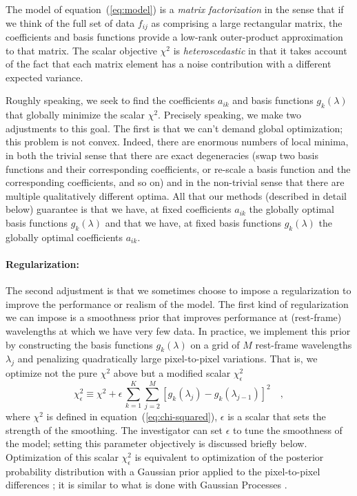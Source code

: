 \documentclass[12pt,preprint]{aastex}
\newcommand{\equationname}{equation}
\begin{document}
The model of \equationname~(\ref{eq:model}) is a \emph{matrix
  factorization} in the sense that if we think of the full set of data
$f_{ij}$ as comprising a large rectangular matrix, the coefficients
and basis functions provide a low-rank outer-product approximation to
that matrix.  The scalar objective $\chi^2$ is \emph{heteroscedastic}
in that it takes account of the fact that each matrix element has a
noise contribution with a different expected variance.

Roughly speaking, we seek to find the coefficients $a_{ik}$ and basis
functions $g_k(\lambda)$ that globally minimize the scalar $\chi^2$.
Precisely speaking, we make two adjustments to this goal. The first is
that we can't demand global optimization; this problem is not convex.
Indeed, there are enormous numbers of local minima, in both the
trivial sense that there are exact degeneracies (swap two basis
functions and their corresponding coefficients, or re-scale a basis
function and the corresponding coefficients, and so on) and in the
non-trivial sense that there are multiple qualitatively different
optima. All that our methods (described in detail below) guarantee is
that we have, at fixed coefficients $a_{ik}$ the globally optimal
basis functions $g_k(\lambda)$ and that we have, at fixed basis
functions $g_k(\lambda)$ the globally optimal coefficients $a_{ik}$.

\paragraph{Regularization:}
The second adjustment is that we sometimes choose to impose a
regularization to improve the performance or realism of the model.
The first kind of regularization we can impose is a smoothness prior
that improves performance at (rest-frame) wavelengths at which we have
very few data. In practice, we implement this prior by constructing
the basis functions $g_k(\lambda)$ on a grid of $M$ rest-frame wavelengths
$\lambda_j$ and penalizing quadratically large pixel-to-pixel
variations. That is, we optimize not the pure $\chi^2$ above but a
modified scalar $\chi_{\epsilon}^2$
\begin{equation}\label{eq:smoothness}
\chi_{\epsilon}^2 \equiv \chi^2
 + \epsilon\,\sum_{k=1}^K \sum_{j=2}^{M}
 \left[g_k(\lambda_{j})-g_k(\lambda_{j-1})\right]^2
\quad ,
\end{equation}
where $\chi^2$ is defined in \equationname~(\ref{eq:chi-squared}),
$\epsilon$ is a scalar that sets the strength of the smoothing.  The
investigator can set $\epsilon$ to tune the smoothness of the model;
setting this parameter objectively is discussed briefly below.
Optimization of this scalar $\chi_{\epsilon}^2$ is equivalent to
optimization of the posterior probability distribution with a Gaussian
prior applied to the pixel-to-pixel differences \citep[for
  example,][]{smoothness}; it is similar to what is done with Gaussian
Processes \citep[for example,][]{Rasmussen06a}.
\end{document}
